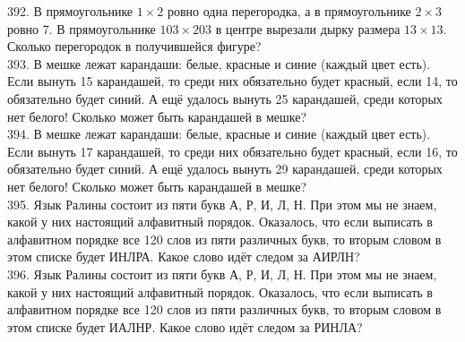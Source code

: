\documentclass[12pt]{article}
\begin{document}
392. В прямоугольнике $1\times2$ ровно одна перегородка, а в прямоугольнике $2\times3$ ровно 7. В прямоугольнике $103\times203$ в центре вырезали
дырку размера $13\times13.$ Сколько перегородок в получившейся фигуре?\\
393. В мешке лежат карандаши: белые, красные и синие (каждый цвет есть). Если вынуть 15 карандашей, то среди них обязательно будет красный, если 14, то обязательно будет синий. А ещё удалось вынуть 25 карандашей, среди которых нет белого! Сколько может быть карандашей в мешке?\\
394. В мешке лежат карандаши: белые, красные и синие (каждый цвет есть). Если вынуть 17 карандашей, то среди них обязательно будет красный, если 16, то обязательно будет синий. А ещё удалось вынуть 29 карандашей, среди которых нет белого! Сколько может быть карандашей в мешке?\\
395. Язык Ралины состоит из пяти букв А, Р, И, Л, Н. При этом мы не знаем, какой у них настоящий алфавитный порядок. Оказалось, что если выписать в алфавитном порядке все 120 слов из пяти различных букв, то вторым словом в этом списке будет ИНЛРА. Какое слово идёт следом за АИРЛН?\\
396. Язык Ралины состоит из пяти букв А, Р, И, Л, Н. При этом мы не знаем, какой у них настоящий алфавитный порядок. Оказалось, что если выписать в алфавитном порядке все 120 слов из пяти различных букв, то вторым словом в этом списке будет ИАЛНР. Какое слово идёт следом за РИНЛА?
\end{document}
